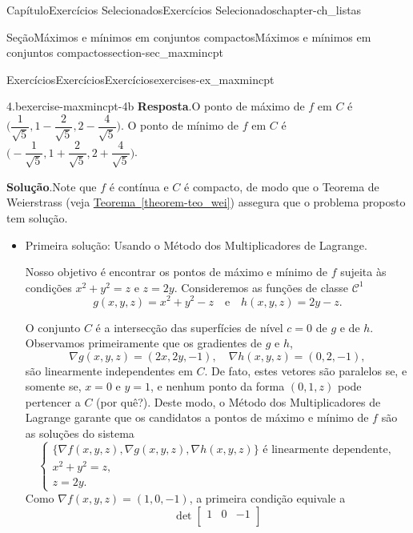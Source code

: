 \documentclass[oneside,10pt,]{book}
\newcommand{\blocktitlefont}{\relax}
\newcommand{\xreffont}{\relax}
\numberwithin{equation}{section}
\begin{document}
\begin{chapterptx}{Capítulo}{Exercícios Selecionados}{}{Exercícios Selecionados}{}{}{chapter-ch_listas}
\begin{sectionptx}{Seção}{Máximos e mínimos em conjuntos compactos}{}{Máximos e mínimos em conjuntos compactos}{}{}{section-sec_maxmincpt}
\begin{exercises-subsection-numberless}{Exercícios}{Exercícios}{}{Exercícios}{}{}{exercises-ex_maxmincpt}
\begin{divisionexercise}{4.b}{}{}{exercise-maxmincpt-4b}
\noindent\textbf{\blocktitlefont Resposta}.\hypertarget{answer-maxmincpt-4b-c}{}\quad{}O ponto de máximo de \(f\) em \(C\) é \(\big(\dfrac{1}{\sqrt{5}}, 1 - \dfrac{2}{\sqrt{5}}, 2 -
\dfrac{4}{\sqrt{5}}\big)\). O ponto de mínimo de \(f\) em \(C\) é \(\big( -\dfrac{1}{\sqrt{5}}, 1 + \dfrac{2}{\sqrt{5}}, 2 +
\dfrac{4}{\sqrt{5}}\big)\).%
\par\smallskip%
\noindent\textbf{\blocktitlefont Solução}.\hypertarget{solution-maxmincpt-4b-d}{}\quad{}Note que \(f\) é contínua e \(C\) é compacto, de modo que o Teorema de Weierstrass (veja \hyperref[theorem-teo_wei]{Teorema~{\xreffont\ref{theorem-teo_wei}}}) assegura que o problema proposto tem solução.%
%
\begin{itemize}[label=\textbullet]
\item{}Primeira solução: Usando o Método dos Multiplicadores de Lagrange.%
\par
Nosso objetivo é encontrar os pontos de máximo e mínimo de \(f\) sujeita às condições \(x^2 + y^2 = z\) e \(z=2y\). Consideremos as funções de classe \(\mathscr{C}^1\)%
\begin{equation*}
g(x,y,z) = x^2 + y^2 - z \quad
\text{e}\quad h(x,y,z) = 2y-z.
\end{equation*}
%
\par
O conjunto \(C\) é a intersecção das superfícies de nível \(c=0\) de \(g\) e de \(h\). Observamos primeiramente que os gradientes de \(g\) e \(h\),%
\begin{equation*}
\nabla g(x,y,z) = (2x,2y,-1), \quad
\nabla h(x,y,z) = (0,2,-1),
\end{equation*}
são linearmente independentes em \(C\). De fato, estes vetores são paralelos se, e somente se, \(x=0\) e \(y=1\), e nenhum ponto da forma \((0,1,z)\) pode pertencer a \(C\) (por quê?). Deste modo, o Método dos Multiplicadores de Lagrange garante que os candidatos a pontos de máximo e mínimo de \(f\) são as soluções do sistema%
\begin{equation*}
\begin{cases}
\big\{\nabla f(x,y,z), \nabla g(x,y,z), \nabla
h(x,y,z)\big\}\text{ é linearmente dependente},\\
x^2 + y^2 = z,\\
z=2y.
\end{cases}
\end{equation*}
Como \(\nabla f(x,y,z) = (1,0,-1)\), a primeira condição equivale a%
\begin{equation*}
\det\begin{bmatrix}
1& 0 & -1\\

\end{bmatrix}
\end{equation*}
\end{itemize}
\end{divisionexercise}
\end{exercises-subsection-numberless}
\end{sectionptx}
\end{chapterptx}
\end{document}
